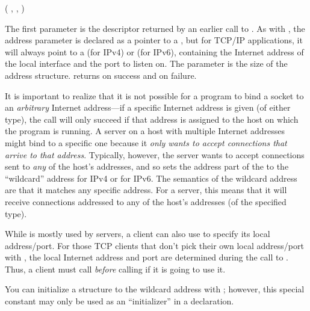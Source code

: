 \begin{inlinefcn}
 ( , 
, 
 )
\end{inlinefcn}

The first parameter is the descriptor returned by an earlier call to
.  As with , the address
parameter is declared as a pointer to a , but for
TCP/IP applications, it will always point to a
 (for IPv4) or  (for IPv6),
containing the Internet address of the local interface and the port to
listen on.
The  parameter is the size
of the address structure.   returns
 on success and  on failure.

It is important to realize that it is not possible for a program to
bind a socket to an \emph{arbitrary\/} Internet address---if a
specific Internet address is given (of either type),
the call will only succeed if that
address is assigned to the host on which the program is running.
A server on a host with
multiple Internet addresses might bind to a specific one because it
\emph{only wants to accept connections that arrive to that address}.
Typically, however, the server wants to accept connections sent to
\emph{any\/} of the host's addresses, and so sets
the address part of the  to
the ``wildcard'' address  for IPv4 or 
 for IPv6.  The semantics of the wildcard
address are that it matches any specific address.  For a server, this
means that it will receive connections addressed to any of the host's
addresses (of the specified type).

While
 is mostly used by servers, a client can also use
 to specify its local address/port.  For those
TCP clients that don't pick their own local address/port with
, the local 
Internet address and port are determined
during the call to .   Thus, a
client must call  \emph{before\/} calling
 if it is going to use it.

You can initialize a  structure to the
wildcard address with ; however, this
special constant may only
be used as an ``initializer'' in a declaration.

